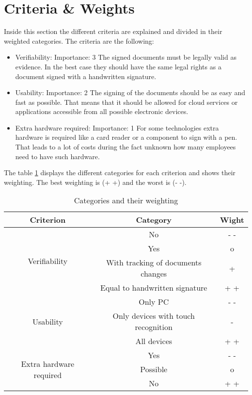 \section{Criteria \& Weights} \label{sec:criteria}
Inside this section the different criteria are explained and divided in their weighted categories. The criteria are the following:
\begin{itemize}
	\item Verifiability: \newline
	Importance: 3 \newline
	The signed documents must be legally valid as evidence. In the best case they should have the same legal rights as a document signed with a handwritten signature.
	\item Usability: \newline
	Importance: 2 \newline
	The signing of the documents should be as easy and fast as possible. That means that it should be allowed for cloud services or applications accessible from all possible electronic devices. 
	\item Extra hardware required: \newline
	Importance: 1 \newline
	For some technologies extra hardware is required like a card reader or a component to sign with a pen. That leads to a lot of costs during the fact unknown how many employees need to have such hardware.
\end{itemize} 

The table \ref{Tab:criteria} displays the different categories for each criterion and shows their weighting. The best weighting is (+ +) and the worst is (- -). 

\begin{table}[h]
	\begin{tabular}{|c|c|c|} \hline
		Criterion  & Category & Wight \\ \hline
		\multirow{4}{*}{Verifiability} & No & - - \\ \cline{2-3}
									   & Yes & o \\ \cline{2-3}
									   & With tracking of documents changes & + \\ \cline{2-3}
									   & Equal to handwritten signature & + + \\ \cline{1-3}
		\multirow{3}{*}{Usability} & Only PC & - - \\ \cline{2-3}
		                           & Only devices with touch recognition & - \\ \cline{2-3}
								   & All devices & + + \\ \cline{1-3}
		\multirow{3}{*}{Extra hardware required} & Yes & - -\\ \cline{2-3}
												& Possible & o \\ \cline{2-3}
												& No & + +  \\ \cline{1-3}
	\end{tabular}
	\caption{Categories and their weighting}
	\label{Tab:criteria}
\end{table}